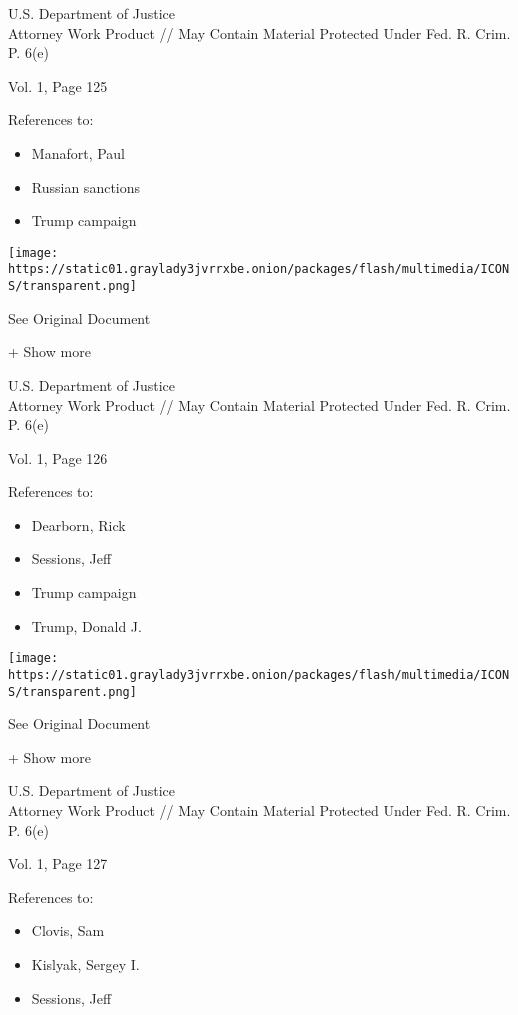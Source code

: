 U.S. Department of Justice\\
Attorney Work Product // May Contain Material Protected Under Fed. R.
Crim. P. 6(e)

Vol. 1, Page 125

References to:

\begin{itemize}
\tightlist
\item
  Manafort, Paul 
\item
  Russian sanctions
\item
  Trump campaign
\end{itemize}

\protect\hyperlink{}{}

\texttt{[image: https://static01.graylady3jvrrxbe.onion/packages/flash/multimedia/ICONS/transparent.png]}

See Original Document

+ Show more

U.S. Department of Justice\\
Attorney Work Product // May Contain Material Protected Under Fed. R.
Crim. P. 6(e)

Vol. 1, Page 126

References to:

\begin{itemize}
\tightlist
\item
  Dearborn, Rick
\item
  Sessions, Jeff
\item
  Trump campaign
\item
  Trump, Donald J.
\end{itemize}

\protect\hyperlink{}{}

\texttt{[image: https://static01.graylady3jvrrxbe.onion/packages/flash/multimedia/ICONS/transparent.png]}

See Original Document

+ Show more

U.S. Department of Justice\\
Attorney Work Product // May Contain Material Protected Under Fed. R.
Crim. P. 6(e)

Vol. 1, Page 127

References to:

\begin{itemize}
\tightlist
\item
  Clovis, Sam
\item
  Kislyak, Sergey I.
\item
  Sessions, Jeff
\end{itemize}

